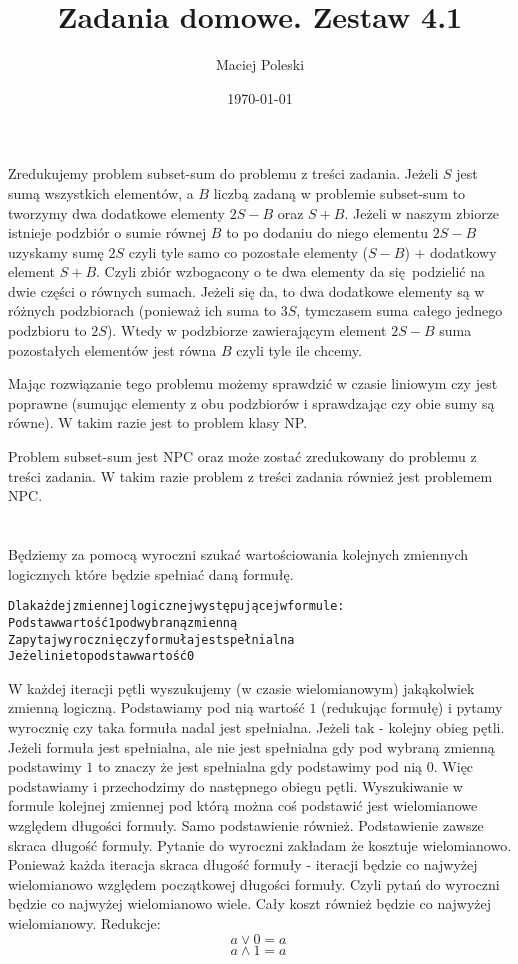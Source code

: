 \documentclass[a4paper,12pt]{article}
\title{Zadania domowe. Zestaw 4.1}
\author{Maciej Poleski}
\date{\today}
\begin{document}
\maketitle

\newpage

\section{}
Zredukujemy problem subset-sum do problemu z treści zadania. Jeżeli $S$ jest sumą wszystkich elementów, a $B$ liczbą zadaną w problemie subset-sum to tworzymy dwa dodatkowe elementy $2S-B$ oraz $S+B$. Jeżeli w naszym zbiorze istnieje podzbiór o sumie równej $B$ to po dodaniu do niego elementu $2S-B$ uzyskamy sumę $2S$ czyli tyle samo co pozostałe elementy ($S-B$) + dodatkowy element $S+B$. Czyli zbiór wzbogacony o te dwa elementy da się podzielić na dwie części o równych sumach. Jeżeli się da, to dwa dodatkowe elementy są w różnych podzbiorach (ponieważ ich suma to $3S$, tymczasem suma całego jednego podzbioru to $2S$). Wtedy w podzbiorze zawierającym element $2S-B$ suma pozostałych elementów jest równa $B$ czyli tyle ile chcemy.

Mając rozwiązanie tego problemu możemy sprawdzić w czasie liniowym czy jest poprawne (sumując elementy z obu podzbiorów i sprawdzając czy obie sumy są równe). W takim razie jest to problem klasy NP.

Problem subset-sum jest NPC oraz może zostać zredukowany do problemu z treści zadania. W takim razie problem z treści zadania również jest problemem NPC.

\section{}
Będziemy za pomocą wyroczni szukać wartościowania kolejnych zmiennych logicznych które będzie spełniać daną formułę.
\begin{alltt}
 Dla każdej zmiennej logicznej występującej w formule:
    Podstaw wartość 1 pod wybraną zmienną
    Zapytaj wyrocznię czy formuła jest spełnialna
        Jeżeli nie to podstaw wartość 0
\end{alltt}
W każdej iteracji pętli wyszukujemy (w czasie wielomianowym) jakąkolwiek zmienną logiczną. Podstawiamy pod nią wartość $1$ (redukując formułę) i pytamy wyrocznię czy taka formuła nadal jest spełnialna. Jeżeli tak - kolejny obieg pętli. Jeżeli formuła jest spełnialna, ale nie jest spełnialna gdy pod wybraną zmienną podstawimy $1$ to znaczy że jest spełnialna gdy podstawimy pod nią $0$. Więc podstawiamy i przechodzimy do następnego obiegu pętli. Wyszukiwanie w formule kolejnej zmiennej pod którą można coś podstawić jest wielomianowe względem długości formuły. Samo podstawienie również. Podstawienie zawsze skraca długość formuły. Pytanie do wyroczni zakładam że kosztuje wielomianowo. Ponieważ każda iteracja skraca długość formuły - iteracji będzie co najwyżej wielomianowo względem początkowej długości formuły. Czyli pytań do wyroczni będzie co najwyżej wielomianowo wiele. Cały koszt również będzie co najwyżej wielomianowy.
Redukcje:
$$ a \vee 0 = a\ $$
$$ a \wedge 1 = a\ $$
\end{document}
